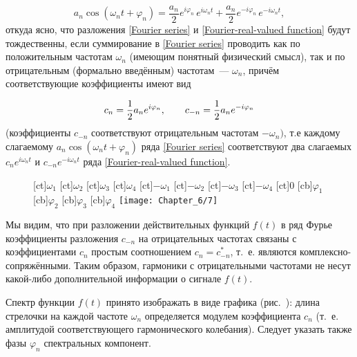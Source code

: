 \begin{equation*}
	a_n\cos(\omega_nt+\varphi_n)=\frac{a_n}{2}e^{i\varphi_n}\,e^{i\omega_n t}+\frac{a_n}{2}e^{-i\varphi_n}\,e^{-i\omega_n t},
\end{equation*}
откуда ясно, что разложения \eqref{Fourier series} и \eqref{Fourier-real-valued function} будут тождественны, если суммирование в \eqref{Fourier series} проводить как по
положительным частотам $\omega_n$ (имеющим понятный физический смысл), так и по отрицательным (формально введённым)
частотам~--- $\omega_n$, причём соответствующие коэффициенты имеют вид

\begin{equation}
	\eqmark{Fourier-coefficient}
	c_n =\frac{1}{2}a_n e^{i\varphi_n}, \qquad c_{-n}=\frac{1}{2}a_n e^{-i\varphi_n}
\end{equation}
(коэффициенты $c_{-n}$ соответствуют отрицательным частотам $-\omega_n)$, т.е каждому слагаемому $a_n\cos(\omega_nt+\varphi_n)$
ряда \eqref{Fourier series} соответствуют два слагаемых $c_ne^{i\omega_n t}$ и $c_{-n}e^{-i\omega_n t}$ ряда \eqref{Fourier-real-valued function}.

\begin{wrapfigure}{r}{0.35\textwidth}
	[ct]{$\omega_1$}
	[ct]{$\omega_2$}
	[ct]{$\omega_3$}
	[ct]{$\omega_4$}
	[ct]{$-\omega_{1}$}
	[ct]{$-\omega_{2}$}
	[ct]{$-\omega_{3}$}
	[ct]{$-\omega_{4}$}
	[ct]{0}
	[cb]{$\varphi_1$}
	[cb]{$\varphi_2$}
	[cb]{$\varphi_3$}
	[cb]{$\varphi_4$}
	\texttt{[image: Chapter\_6/7]}
	\caption{}
\end{wrapfigure}

Мы видим, что при разложении действительных функций $f(t)$ в ряд Фурье коэффициенты разложения $c_{-n}$ на отрицательных
частотах связаны с коэффициентами $c_n$ простым соотношением $c_n=c_{-n}^*$, т.~е. являются комплексно-сопряжёнными.
Таким образом, гармоники с отрицательными частотами не несут какой-либо дополнительной информации о сигнале $f(t)$.

Спектр функции $f(t)$ принято изображать в виде графика (рис.~): длина стрелочки на каждой частоте $\omega_n$ определяется
модулем коэффициента $c_n$ (т.~е. амплитудой соответствующего гармонического колебания). Следует указать также фазы
$\varphi_n$ спектральных компонент.

